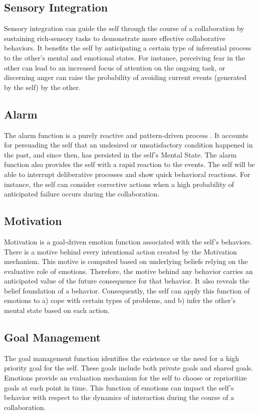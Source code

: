 \documentclass[12pt]{report}
\begin{document}
\subsection{Sensory Integration} Sensory integration can guide the self
through the course of a collaboration by sustaining rich-sensory tasks to
demonstrate more effective collaborative behaviors. It benefits the self by
anticipating a certain type of inferential process to the other's mental and
emotional states. For instance, perceiving fear in the other can lead to an
increased focus of attention on the ongoing task, or discerning anger can raise
the probability of avoiding current events (generated by the self) by the other.

\subsection{Alarm} \label{sub:emotion-alarm} The alarm function is a purely
reactive and pattern-driven process \cite{sloman:beyond-shallow}. It accounts
for persuading the self that an undesired or unsatisfactory condition happened
in the past, and since then, has persisted in the self's Mental State. The
alarm function also provides the self with a rapid reaction to the events. The
self will be able to interrupt deliberative processes and show quick behavioral
reactions. For instance, the self can consider corrective actions when a high
probability of anticipated failure occurs during the collaboration.

\subsection{Motivation} Motivation is a goal-driven emotion function
associated with the self's behaviors. There is a motive behind every intentional action
created by the Motivation mechanism. This motive is computed based on underlying
beliefs relying on the evaluative role of emotions. Therefore, the motive behind
any behavior carries an anticipated value of the future consequence for that
behavior. It also reveals the belief foundation of a behavior. Consequently, the
self can apply this function of emotions to a) cope with certain types of
problems, and b) infer the other's mental state based on each action.

\subsection{Goal Management} The goal management function identifies the
existence or the need for a high priority goal for the self. These goals
include both private goals and shared goals. Emotions provide an evaluation
mechanism for the self to choose or reprioritize goals at each point in time.
This function of emotions can impact the self's behavior with respect to the
dynamics of interaction during the course of a collaboration.
\end{document}
